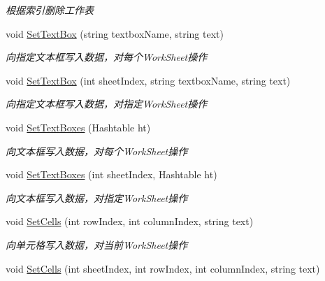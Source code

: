 \begin{DoxyCompactItemize}
\begin{DoxyCompactList}\small\item\em 根据索引删除工作表 \end{DoxyCompactList}\item 
void \hyperlink{class_x_c_l_net_tools_1_1_office_1_1_excel_handler_1_1_excel_helper_a5ae2a9cc10bd517ae122b9f74608d28f}{Set\-Text\-Box} (string textbox\-Name, string text)
\begin{DoxyCompactList}\small\item\em 向指定文本框写入数据，对每个\-Work\-Sheet操作 \end{DoxyCompactList}\item 
void \hyperlink{class_x_c_l_net_tools_1_1_office_1_1_excel_handler_1_1_excel_helper_ae6999962417a5ac284af99ef3305c14e}{Set\-Text\-Box} (int sheet\-Index, string textbox\-Name, string text)
\begin{DoxyCompactList}\small\item\em 向指定文本框写入数据，对指定\-Work\-Sheet操作 \end{DoxyCompactList}\item 
void \hyperlink{class_x_c_l_net_tools_1_1_office_1_1_excel_handler_1_1_excel_helper_abb6a218200a17f2be52b999e5d458df5}{Set\-Text\-Boxes} (Hashtable ht)
\begin{DoxyCompactList}\small\item\em 向文本框写入数据，对每个\-Work\-Sheet操作 \end{DoxyCompactList}\item 
void \hyperlink{class_x_c_l_net_tools_1_1_office_1_1_excel_handler_1_1_excel_helper_afcac92ace2a349e193920ad28101dd0e}{Set\-Text\-Boxes} (int sheet\-Index, Hashtable ht)
\begin{DoxyCompactList}\small\item\em 向文本框写入数据，对指定\-Work\-Sheet操作 \end{DoxyCompactList}\item 
void \hyperlink{class_x_c_l_net_tools_1_1_office_1_1_excel_handler_1_1_excel_helper_ad69661f169802e75d2ff920d5935f99e}{Set\-Cells} (int row\-Index, int column\-Index, string text)
\begin{DoxyCompactList}\small\item\em 向单元格写入数据，对当前\-Work\-Sheet操作 \end{DoxyCompactList}\item 
void \hyperlink{class_x_c_l_net_tools_1_1_office_1_1_excel_handler_1_1_excel_helper_a8344816c7157ec0b4a2d4c7ca9e3bd4c}{Set\-Cells} (int sheet\-Index, int row\-Index, int column\-Index, string text)

\end{DoxyCompactItemize}
